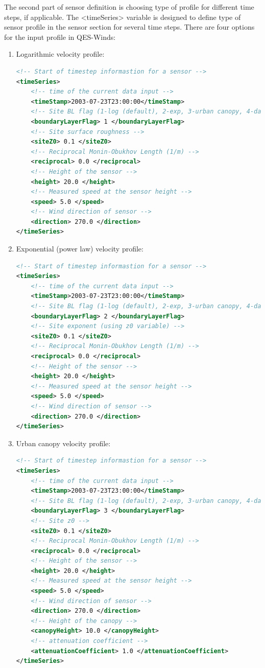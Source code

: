 The second part of sensor definition is choosing type of profile for different time steps, if applicable. The <timeSeries> variable is designed to define type of sensor profile in the sensor section for several time steps. There are four options for the input profile in QES-Winds:

\begin{enumerate}
\item Logarithmic velocity profile:

\begin{lstlisting}[language=XML]
<!-- Start of timestep informastion for a sensor -->
<timeSeries>
	<!-- time of the current data input -->
	<timeStamp>2003-07-23T23:00:00</timeStamp>		
	<!-- Site BL flag (1-log (default), 2-exp, 3-urban canopy, 4-data entry) -->
	<boundaryLayerFlag> 1 </boundaryLayerFlag>
	<!-- Site surface roughness -->
	<siteZ0> 0.1 </siteZ0>
	<!-- Reciprocal Monin-Obukhov Length (1/m) -->
	<reciprocal> 0.0 </reciprocal>
	<!-- Height of the sensor -->
	<height> 20.0 </height>
	<!-- Measured speed at the sensor height -->
	<speed> 5.0 </speed>
	<!-- Wind direction of sensor -->
	<direction> 270.0 </direction>
</timeSeries>
\end{lstlisting}

\item Exponential (power law) velocity profile:

\begin{lstlisting}[language=XML]
<!-- Start of timestep informastion for a sensor -->
<timeSeries>
	<!-- time of the current data input -->
	<timeStamp>2003-07-23T23:00:00</timeStamp>	
	<!-- Site BL flag (1-log (default), 2-exp, 3-urban canopy, 4-data entry) -->
	<boundaryLayerFlag> 2 </boundaryLayerFlag>
	<!-- Site exponent (using z0 variable) -->
	<siteZ0> 0.1 </siteZ0>
	<!-- Reciprocal Monin-Obukhov Length (1/m) -->
	<reciprocal> 0.0 </reciprocal>
	<!-- Height of the sensor -->
	<height> 20.0 </height>
	<!-- Measured speed at the sensor height -->
	<speed> 5.0 </speed>
	<!-- Wind direction of sensor -->
	<direction> 270.0 </direction>
</timeSeries>
\end{lstlisting}

\item Urban canopy velocity profile:

\begin{lstlisting}[language=XML]
<!-- Start of timestep informastion for a sensor -->
<timeSeries>
	<!-- time of the current data input -->
	<timeStamp>2003-07-23T23:00:00</timeStamp>	
	<!-- Site BL flag (1-log (default), 2-exp, 3-urban canopy, 4-data entry) -->
	<boundaryLayerFlag> 3 </boundaryLayerFlag>
	<!-- Site z0 -->
	<siteZ0> 0.1 </siteZ0>
	<!-- Reciprocal Monin-Obukhov Length (1/m) -->
	<reciprocal> 0.0 </reciprocal>
	<!-- Height of the sensor -->
	<height> 20.0 </height>
	<!-- Measured speed at the sensor height -->
	<speed> 5.0 </speed>
	<!-- Wind direction of sensor -->
	<direction> 270.0 </direction>
	<!-- Height of the canopy -->
	<canopyHeight> 10.0 </canopyHeight>
	<!-- attenuation coefficient -->
	<attenuationCoefficient> 1.0 </attenuationCoefficient>
</timeSeries>
\end{lstlisting}


\end{enumerate}
